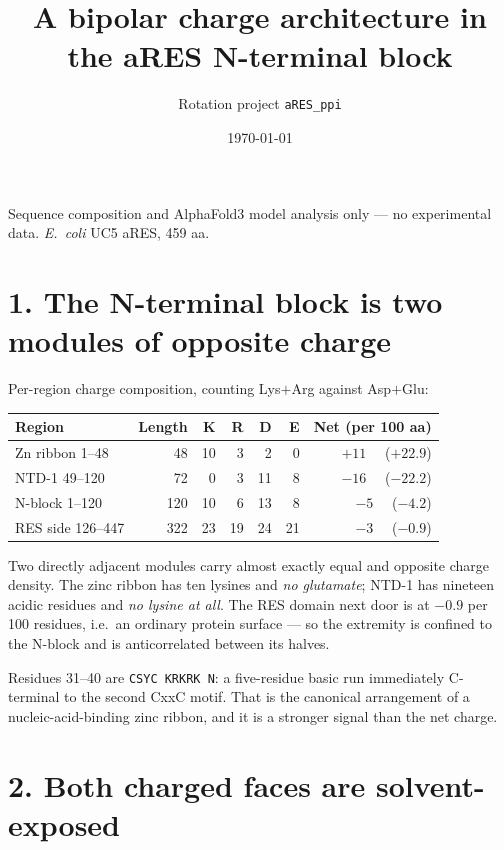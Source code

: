\documentclass[11pt,a4paper]{article}
\title{\vspace{-1.3cm}\textbf{A bipolar charge architecture in the aRES N-terminal block}}
\author{\normalsize Rotation project \texttt{aRES\_ppi}}
\date{\normalsize\today}
\begin{document}
\maketitle
\vspace{-0.7cm}

Sequence composition and AlphaFold3 model analysis only --- no experimental data.
\emph{E.~coli} UC5 aRES, 459 aa.

\section*{1. The N-terminal block is two modules of opposite charge}

Per-region charge composition, counting Lys$+$Arg against Asp$+$Glu:

\begin{center}
\begin{tabular}{lrrrrrr}
\toprule
Region & Length & K & R & D & E & Net (per 100 aa) \\
\midrule
Zn ribbon 1--48      &  48 & 10 &  3 &  2 &  0 & $+11$ \ \ ($+22.9$) \\
NTD-1 49--120        &  72 &  0 &  3 & 11 &  8 & $-16$ \ \ ($-22.2$) \\
N-block 1--120       & 120 & 10 &  6 & 13 &  8 & $-5$ \ \ ($-4.2$) \\
RES side 126--447    & 322 & 23 & 19 & 24 & 21 & $-3$ \ \ ($-0.9$) \\
\bottomrule
\end{tabular}
\end{center}

Two directly adjacent modules carry almost exactly equal and opposite charge density. The zinc
ribbon has ten lysines and \emph{no glutamate}; NTD-1 has nineteen acidic residues and \emph{no
lysine at all}. The RES domain next door is at $-0.9$ per 100 residues, i.e.\ an ordinary protein
surface --- so the extremity is confined to the N-block and is anticorrelated between its halves.

Residues 31--40 are \texttt{CSYC\,KRKRK\,N}: a five-residue basic run immediately C-terminal to the
second CxxC motif. That is the canonical arrangement of a nucleic-acid-binding zinc ribbon, and it
is a stronger signal than the net charge.

\section*{2. Both charged faces are solvent-exposed}
\end{document}
